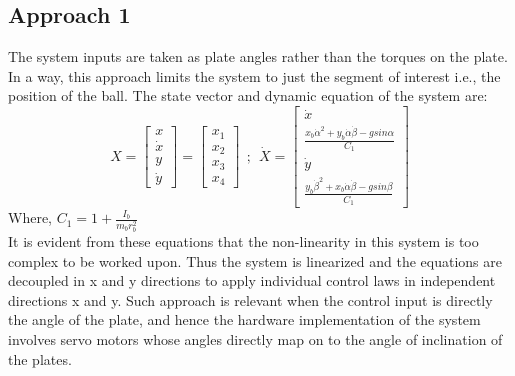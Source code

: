 \documentclass[conference]{IEEEtran}
\begin{document}
\subsection*{Approach 1}
The system inputs are taken as plate angles rather than the torques on the plate. In a way, this approach limits the system to just the segment of interest i.e., the position of the ball. The state vector and dynamic equation of the system are:
\begin{equation} X = \begin{bmatrix}
x \\ \dot x \\ y \\ \dot y
\end{bmatrix} = 
\begin{bmatrix}
x_{1} \\ x_{2} \\ x_{3} \\ x_{4}
\end{bmatrix} \>\>;\>\>
\dot X = \begin{bmatrix}
\dot x \\ \frac{x_{b} \dot \alpha^{2} + y_{b} \dot \alpha \dot \beta - gsin\alpha}{C_{1}} \\ \dot y \\ \frac{y_{b} \dot \beta^{2} + x_{b} \dot \alpha \dot \beta - gsin\beta}{C_{1}}
\end{bmatrix}%
\end{equation} 
Where, $C_{1} = 1+\frac{I_{b}}{m_{b} r_{b}^{2}}$\\
It is evident from these equations that the non-linearity in this system is too complex to be worked upon. Thus the system is linearized and the equations are decoupled in x and y directions to apply individual control laws in independent directions x and y. Such approach is relevant when the control input is directly the angle of the plate, and hence the hardware implementation of the system involves servo motors whose angles directly map on to the angle of inclination of the plates.
\end{document}
